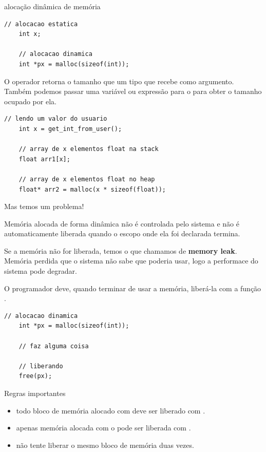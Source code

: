 \documentclass{beamer}
\begin{document}
\begin{frame}{alocação dinâmica de memória}
  \framebreak

  \begin{lstlisting}[style=normalc]
    // alocacao estatica
    int x;
    
    // alocacao dinamica
    int *px = malloc(sizeof(int));
  \end{lstlisting}

  O operador  retorna o tamanho que um tipo que recebe
  como argumento. Também podemos passar uma variável ou expressão para
  o  para obter o tamanho ocupado por ela.

  \framebreak

  \begin{lstlisting}[style=normalc]
    // lendo um valor do usuario
    int x = get_int_from_user();
    
    // array de x elementos float na stack
    float arr1[x];
    
    // array de x elementos float no heap
    float* arr2 = malloc(x * sizeof(float));
  \end{lstlisting}

  \framebreak

  Mas temos um problema!

  Memória alocada de forma dinâmica não é controlada pelo sistema e
  não é automaticamente liberada quando o escopo onde ela foi
  declarada termina.

  Se a memória não for liberada, temos o que chamamos de
  \textbf{memory leak}.  Memória perdida que o sistema não sabe que
  poderia usar, logo a performace do sistema pode degradar.

  O programador deve, quando terminar de usar a memória, liberá-la com
  a função .

  \framebreak

  \begin{lstlisting}[style=normalc]
    // alocacao dinamica
    int *px = malloc(sizeof(int));

    // faz alguma coisa

    // liberando
    free(px);
  \end{lstlisting}

  \framebreak

  Regras importantes

  \begin{itemize}
  \item todo bloco de memória alocado com  deve ser liberado com .
  \item apenas memória alocada com o  pode ser liberada com .
  \item não tente liberar o mesmo bloco de memória duas vezes.
  \end{itemize}

\end{frame}
\end{document}
